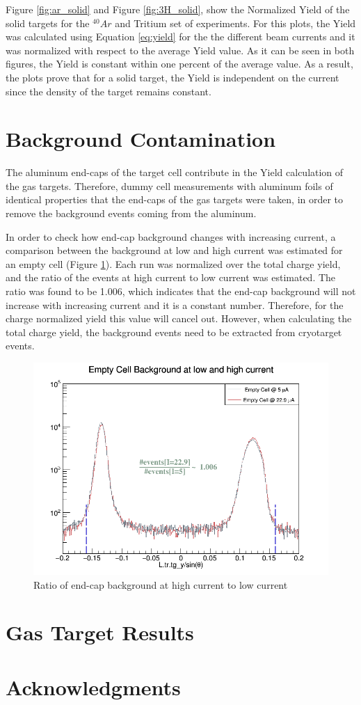 \documentclass[preprint,12pt]{elsarticle}
\begin{document}
Figure \ref{fig:ar_solid} and Figure \ref{fig:3H_solid}, show the Normalized Yield of the solid targets for the $^{40}Ar$ and Tritium set of experiments. For this plots, the Yield was calculated using Equation \ref{eq:yield} for the the different beam currents and it was normalized with respect to the average Yield value. As it can be seen in both figures, the Yield is constant within one percent of the average value. As a result, the plots prove that for a solid target, the Yield is independent on the current since the density of the target remains constant.

\section{Background Contamination}

The aluminum end-caps of the target cell contribute in the Yield calculation of the gas targets. Therefore, dummy cell measurements with aluminum foils of identical properties that the end-caps of the gas targets were taken, in order to remove the background events coming from the aluminum.

In order to check how end-cap background changes with increasing current, a
comparison between the background at low and high current was estimated for
an empty cell (Figure \ref{fig:bk_empty}). Each run was normalized over the total charge yield, and the ratio of the events at high current to low current was estimated. The ratio was found to be 1.006, which indicates that the end-cap background will not increase with increasing current and it is a constant number. Therefore, for the charge normalized yield this value will cancel out. However, when calculating the total charge yield, the background events need to be extracted from cryotarget events.

\begin{figure}[h]
 \centering
 \includegraphics[width=0.6\linewidth]{images/bk_empty.png}
  \caption{Ratio of end-cap background at high current to low current}
  \label{fig:bk_empty}
\end{figure}

 
 
\section{Gas Target Results}


\section{Acknowledgments}

 

\end{document}
